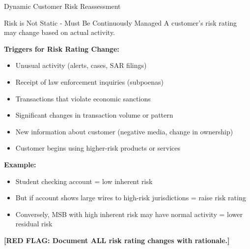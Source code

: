 \documentclass[11pt,a4paper]{beamer}
\newcommand{\redflag}[1]{\textcolor{red!80!black}{\textbf{[RED FLAG: #1]}}}
\begin{document}
	\begin{frame}{Dynamic Customer Risk Reassessment}
		\begin{block}{Risk is Not Static - Must Be Continuously Managed}
			A customer's risk rating may change based on actual activity.
		\end{block}
		\textbf{Triggers for Risk Rating Change:}
		\begin{itemize}
			\item Unusual activity (alerts, cases, SAR filings)
			\item Receipt of law enforcement inquiries (subpoenas)
			\item Transactions that violate economic sanctions
			\item Significant changes in transaction volume or pattern
			\item New information about customer (negative media, change in ownership)
			\item Customer begins using higher-risk products or services
		\end{itemize}
		\textbf{Example:}
		\begin{itemize}
			\item Student checking account = low inherent risk
			\item But if account shows large wires to high-risk jurisdictions = raise risk rating
			\item Conversely, MSB with high inherent risk may have normal activity = lower residual risk
		\end{itemize}
		\redflag{Document ALL risk rating changes with rationale.}
	\end{frame}
	
	
\end{document}
